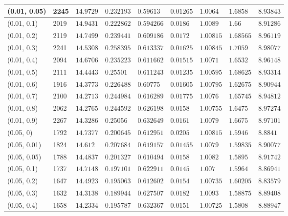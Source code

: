 \begin{center}
{\begin{longtable}{| l | p{} |  p{} | p{} | p{} | p{} | p{} | p{} | p{} |}
 (0.01, 0.05) & 2245  & $14.9729$ & $0.232193$ & $0.59613$ & $0.01265$ & $1.0064$ & $1.6858$ & $8.93843$ \\ \hline
 (0.01, 0.1) & 2019  & $14.9431$ & $0.222862$ & $0.594266$ & $0.0186$ & $1.0089$ & $1.66$ & $8.91286$ \\ \hline
 (0.01, 0.2) & 2119  & $14.7499$ & $0.239441$ & $0.609186$ & $0.0172$ & $1.00815$ & $1.68565$ & $8.96119$ \\ \hline
 (0.01, 0.3) & 2241  & $14.5308$ & $0.258395$ & $0.613337$ & $0.01625$ & $1.00845$ & $1.7059$ & $8.98077$ \\ \hline
 (0.01, 0.4) & 2094  & $14.6706$ & $0.235223$ & $0.611662$ & $0.01515$ & $1.0071$ & $1.6532$ & $8.96148$ \\ \hline
 (0.01, 0.5) & 2111  & $14.4443$ & $0.25501$ & $0.611243$ & $0.01235$ & $1.00595$ & $1.68625$ & $8.93314$ \\ \hline
 (0.01, 0.6) & 1916  & $14.3773$ & $0.226488$ & $0.60775$ & $0.01605$ & $1.00795$ & $1.62675$ & $8.90944$ \\ \hline
 (0.01, 0.7) & 2100  & $14.2713$ & $0.244984$ & $0.616289$ & $0.01775$ & $1.0076$ & $1.65745$ & $8.94812$ \\ \hline
 (0.01, 0.8) & 2062  & $14.2765$ & $0.244592$ & $0.626198$ & $0.0158$ & $1.00755$ & $1.6475$ & $8.97274$ \\ \hline
 (0.01, 0.9) & 2267  & $14.3286$ & $0.25056$ & $0.632649$ & $0.0161$ & $1.0079$ & $1.6675$ & $8.97101$ \\ \hline
 (0.05, 0) & 1792  & $14.7377$ & $0.200645$ & $0.612951$ & $0.0205$ & $1.00815$ & $1.5946$ & $8.8841$ \\ \hline
 (0.05, 0.01) & 1824  & $14.612$ & $0.207684$ & $0.619157$ & $0.01455$ & $1.0079$ & $1.59835$ & $8.90077$ \\ \hline
 (0.05, 0.05) & 1788  & $14.4837$ & $0.201327$ & $0.610494$ & $0.0158$ & $1.0082$ & $1.5895$ & $8.91742$ \\ \hline
 (0.05, 0.1) & 1737  & $14.7148$ & $0.197101$ & $0.622911$ & $0.0145$ & $1.007$ & $1.5964$ & $8.86941$ \\ \hline
 (0.05, 0.2) & 1647  & $14.4923$ & $0.195063$ & $0.612602$ & $0.0154$ & $1.00735$ & $1.60205$ & $8.83579$ \\ \hline
 (0.05, 0.3) & 1632  & $14.3138$ & $0.189944$ & $0.627507$ & $0.0182$ & $1.0093$ & $1.58875$ & $8.89408$ \\ \hline
 (0.05, 0.4) & 1658  & $14.2334$ & $0.195787$ & $0.632367$ & $0.0151$ & $1.00725$ & $1.5808$ & $8.88947$ \\ \hline

\end{longtable}}
\end{center}
